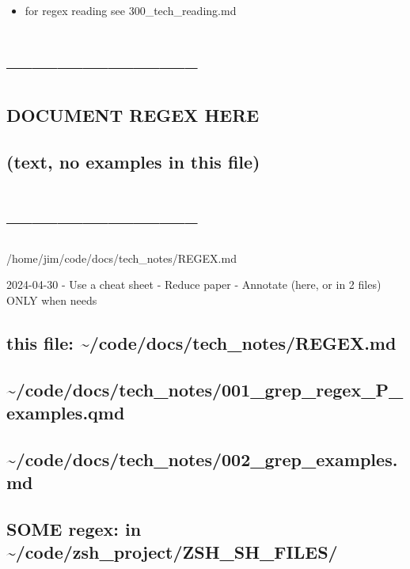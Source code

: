 \documentclass[
  letterpaper,
  DIV=11,
  numbers=noendperiod]{scrartcl}
\providecommand{\tightlist}{%
  \setlength{\itemsep}{0pt}\setlength{\parskip}{0pt}}\usepackage{longtable,booktabs,array}
\begin{document}
\begin{itemize}
\tightlist
\item
  for regex reading see 300\_tech\_reading.md
\end{itemize}

\section{-----------------------}\label{section}

\subsection{DOCUMENT REGEX HERE}\label{document-regex-here}

\subsection{(text, no examples in this
file)}\label{text-no-examples-in-this-file}

\section{-----------------------}\label{section-1}

/home/jim/code/docs/tech\_notes/REGEX.md

2024-04-30 - Use a cheat sheet - Reduce paper - Annotate (here, or in 2
files) ONLY when needs

\subsection{this file:
\textasciitilde/code/docs/tech\_notes/REGEX.md}\label{this-file-codedocstech_notesregex.md}

\subsection{\textasciitilde/code/docs/tech\_notes/001\_grep\_regex\_P\_examples.qmd}\label{codedocstech_notes001_grep_regex_p_examples.qmd}

\subsection{\textasciitilde/code/docs/tech\_notes/002\_grep\_examples.md}\label{codedocstech_notes002_grep_examples.md}

\subsection{SOME regex: in
\textasciitilde/code/zsh\_project/ZSH\_SH\_FILES/}\label{some-regex-in-codezsh_projectzsh_sh_files}
\end{document}
